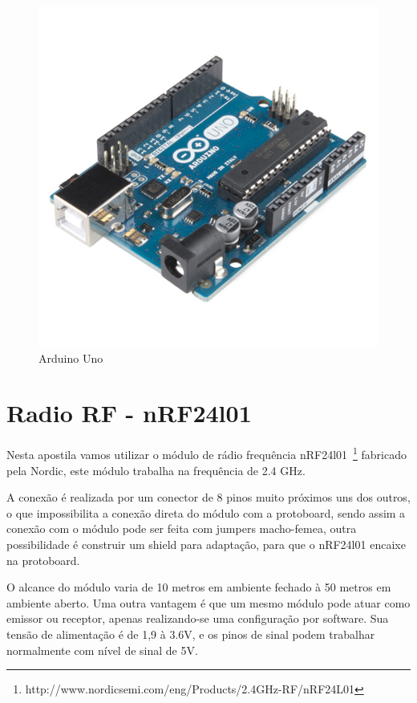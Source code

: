 \begin{figure}[ht]
      \centering
      \includegraphics[scale=0.35]{figuras/arduino.jpg}
      \caption{Arduino Uno}
      \label{fig:arduino}
\end{figure}



\section{Radio RF - nRF24l01}

Nesta apostila vamos utilizar o módulo de rádio frequência nRF24l01~\footnote{http://www.nordicsemi.com/eng/Products/2.4GHz-RF/nRF24L01} fabricado pela Nordic, este módulo trabalha na frequência de 2.4 GHz.

A conexão é realizada por um conector de 8 pinos muito próximos uns dos outros, o que impossibilita a conexão direta do módulo com a protoboard, sendo assim a conexão com o módulo pode ser feita com jumpers macho-femea, outra possibilidade é construir um shield para adaptação, para que o nRF24l01 encaixe na protoboard.

O alcance do módulo varia de 10 metros em ambiente fechado à 50 metros em ambiente aberto. Uma outra vantagem é que um mesmo módulo pode atuar como emissor ou receptor, apenas realizando-se uma configuração por software. Sua tensão de alimentação é de 1,9 à 3.6V, e os pinos de sinal podem trabalhar normalmente com nível de sinal de 5V. 

